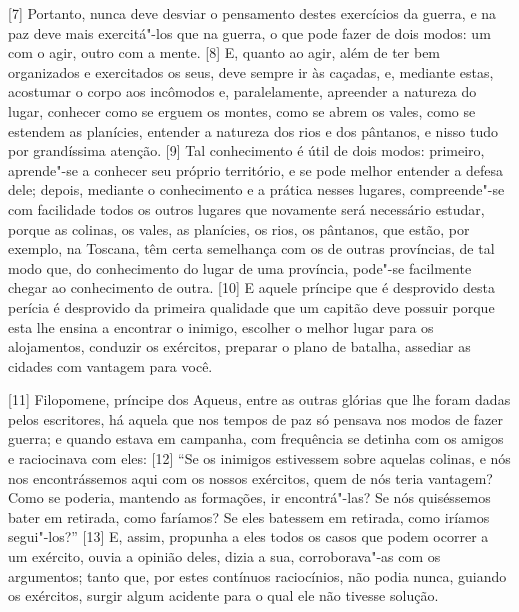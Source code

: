 {[}7{]} Portanto, nunca deve desviar o pensamento destes exercícios da
guerra, e na paz deve mais exercitá"-los que na guerra, o que pode fazer
de dois modos: um com o agir, outro com a mente. {[}8{]} E, quanto ao
agir, além de ter bem organizados e exercitados os seus, deve sempre ir
às caçadas, e, mediante estas, acostumar o corpo aos incômodos e,
paralelamente, apreender a natureza do lugar, conhecer como se erguem os
montes, como se abrem os vales, como se estendem as planícies, entender
a natureza dos rios e dos pântanos, e nisso tudo por grandíssima
atenção. {[}9{]} Tal conhecimento é útil de dois modos: primeiro,
aprende"-se a conhecer seu próprio território, e se pode melhor entender
a defesa dele; depois, mediante o conhecimento e a prática nesses
lugares, compreende"-se com facilidade todos os outros lugares que
novamente será necessário estudar, porque as colinas, os vales, as
planícies, os rios, os pântanos, que estão, por exemplo, na Toscana, têm
certa semelhança com os de outras províncias, de tal modo que, do
conhecimento do lugar de uma província, pode"-se facilmente chegar ao
conhecimento de outra. {[}10{]} E aquele príncipe que é desprovido desta
perícia é desprovido da primeira qualidade que um capitão deve possuir
porque esta lhe ensina a encontrar o inimigo, escolher o melhor lugar
para os alojamentos, conduzir os exércitos, preparar o plano de batalha,
assediar as cidades com vantagem para você.

{[}11{]} Filopomene, príncipe dos Aqueus, entre as outras
glórias que lhe foram dadas pelos escritores, há aquela que nos tempos de paz só pensava nos modos
de fazer guerra; e quando estava em campanha, com frequência se detinha
com os amigos e raciocinava com eles: {[}12{]} ``Se os inimigos
estivessem sobre aquelas colinas, e nós nos encontrássemos aqui com os
nossos exércitos, quem de nós teria vantagem? Como se poderia, mantendo
as formações, ir encontrá"-las? Se nós quiséssemos bater em retirada,
como faríamos? Se eles batessem em retirada, como iríamos
segui"-los?'' {[}13{]} E, assim, propunha a eles todos
os casos que podem ocorrer a um exército, ouvia a opinião deles, dizia a
sua, corroborava"-as com os argumentos; tanto que, por estes contínuos
raciocínios, não podia nunca, guiando os exércitos, surgir algum
acidente para o qual ele não tivesse solução.

